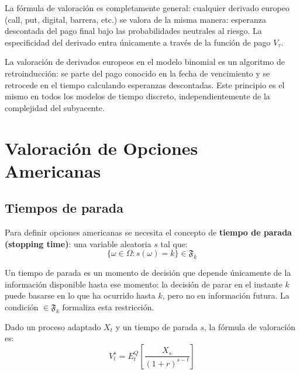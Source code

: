 \documentclass[12pt]{article}
\begin{document}
\begin{intuicionmat}
La f\'ormula de valoraci\'on es completamente general: cualquier derivado europeo (call, put, digital, barrera, etc.) se valora de la misma manera: esperanza descontada del pago final bajo las probabilidades neutrales al riesgo. La especificidad del derivado entra \'unicamente a trav\'es de la funci\'on de pago $V_\tau$.
\end{intuicionmat}

\begin{intuicion}
La valoraci\'on de derivados europeos en el modelo binomial es un algoritmo de retroinducci\'on: se parte del pago conocido en la fecha de vencimiento y se retrocede en el tiempo calculando esperanzas descontadas. Este principio es el mismo en todos los modelos de tiempo discreto, independientemente de la complejidad del subyacente.
\end{intuicion}

\section{Valoraci\'on de Opciones Americanas}

\subsection{Tiempos de parada}

Para definir opciones americanas se necesita el concepto de \textbf{tiempo de parada (stopping time)}: una variable aleatoria $s$ tal que:
\begin{equation}
    \{\omega \in \Omega : s(\omega) = k\} \in \mathfrak{F}_k
\end{equation}

\begin{intuicionmat}
Un tiempo de parada es un momento de decisi\'on que depende \'unicamente de la informaci\'on disponible hasta ese momento: la decisi\'on de parar en el instante $k$ puede basarse en lo que ha ocurrido hasta $k$, pero no en informaci\'on futura. La condici\'on $\in \mathfrak{F}_k$ formaliza esta restricci\'on.
\end{intuicionmat}

Dado un proceso adaptado $X_t$ y un tiempo de parada $s$, la f\'ormula de valoraci\'on es:
\begin{equation}
    V_t^s = E_t^Q\left[\frac{X_s}{(1+r)^{s-t}}\right]
\end{equation}
\end{document}
